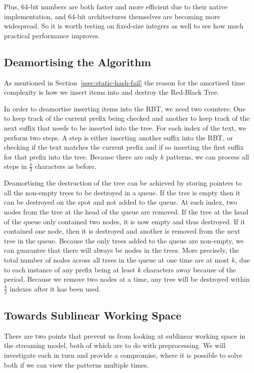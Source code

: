 \documentclass[ %
                    author={Dominic Joseph Moylett},
                    degree={MEng},
                     title={Dictionary Matching with Fingerprints},
                  subtitle={An Empirical Analysis},
                      type={research},
                      year={2015} ]{dissertation}
\begin{document}
Plus, 64-bit numbers are both faster and more efficient due to their native implementation, and 64-bit architectures themselves are becoming more widespread. So it is worth testing on fixed-size integers as well to see how much practical performance improves.

\subsection{Deamortising the Algorithm}
\label{ssec:deamortise}

As mentioned in Section~\ref{ssec:static-hash-fail} the reason for the amortised time complexity is how we insert items into and destroy the Red-Black Tree.

In order to deamortise inserting items into the RBT, we need two counters: One to keep track of the current prefix being checked and another to keep track of the next suffix that needs to be inserted into the tree. For each index of the text, we perform two steps. A step is either inserting another suffix into the RBT, or checking if the text matches the current prefix and if so inserting the first suffix for that prefix into the tree. Because there are only $k$ patterns, we can process all steps in $\frac{k}{2}$ characters as before.

Deamortising the destruction of the tree can be achieved by storing pointers to all the non-empty trees to be destroyed in a queue. If the tree is empty then it can be destroyed on the spot and not added to the queue. At each index, two nodes from the tree at the head of the queue are removed. If the tree at the head of the queue only contained two nodes, it is now empty and thus destroyed. If it contained one node, then it is destroyed and another is removed from the next tree in the queue. Because the only trees added to the queue are non-empty, we can guarantee that there will always be nodes in the trees. More precisely, the total number of nodes across all trees in the queue at one time are at most $k$, due to each instance of any prefix being at least $k$ characters away because of the period. Because we remove two nodes at a time, any tree will be destroyed within $\frac{k}{2}$ indexes after it has been used.

\subsection{Towards Sublinear Working Space}

There are two points that prevent us from looking at sublinear working space in the streaming model, both of which are to do with preprocessing. We will investigate each in turn and provide a compromise, where it is possible to solve both if we can view the patterns multiple times.
\end{document}
